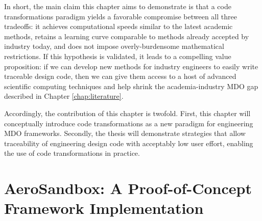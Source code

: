 In short, the main claim this chapter aims to demonstrate is that a code transformations paradigm yields a favorable compromise between all three tradeoffs: it achieves computational speeds similar to the latest academic methods, retains a learning curve comparable to methods already accepted by industry today, and does not impose overly-burdensome mathematical restrictions. If this hypothesis is validated, it leads to a compelling value proposition: if we can develop new methods for industry engineers to easily write traceable design code, then we can give them access to a host of advanced scientific computing techniques and help shrink the academia-industry MDO gap described in Chapter \ref{chap:literature}.

Accordingly, the contribution of this chapter is twofold. First, this chapter will conceptually introduce code transformations as a new paradigm for engineering MDO frameworks. Secondly, the thesis will demonstrate strategies that allow traceability of engineering design code with acceptably low user effort, enabling the use of code transformations in practice.








\section{AeroSandbox: A Proof-of-Concept Framework Implementation}
\label{sec:aerosandbox}

